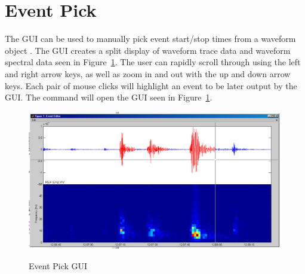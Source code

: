 \documentclass[11pt]{article}
\begin{document}
\clearpage

\section{Event Pick}

The GUI  can be used to manually pick event start/stop times from a waveform object . The GUI creates a split display of waveform trace data and waveform spectral data seen in Figure~\ref{event_pick}. The user can rapidly scroll through  using the left and right arrow keys, as well as zoom in and out with the up and down arrow keys. Each pair of mouse clicks will highlight an event to be later output by the GUI. The command  will open the GUI seen in Figure~\ref{event_pick}.
\begin{figure}[ht] 
\centerline{\scalebox{.5} {\includegraphics{event_pick.png}}} 
\caption{Event Pick GUI} 
\label{event_pick}
\end{figure}
\clearpage
\end{document}

